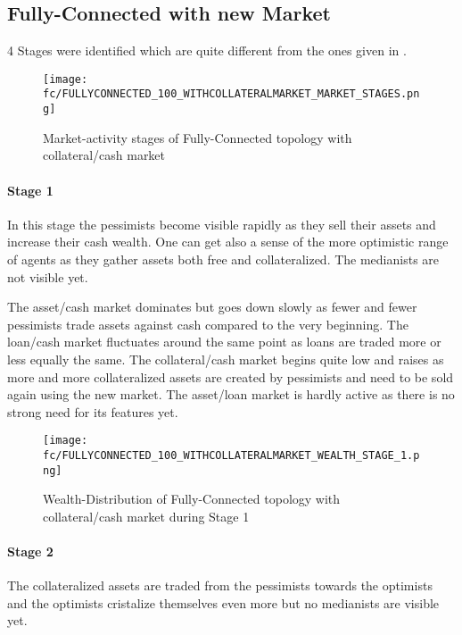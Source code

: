 \documentclass[Bachelorarbeit.tex]{subfiles}
\begin{document}
\subsection{Fully-Connected with new Market}

4 Stages were identified which are quite different from the ones given in \cite{Breuer_2015}.

\begin{figure}[H]
	\centering
  \texttt{[image: fc/FULLYCONNECTED\_100\_WITHCOLLATERALMARKET\_MARKET\_STAGES.png]}
  	\caption{Market-activity stages of Fully-Connected topology with collateral/cash market}
	\label{fig:markets_FULLYCONNECTED_100_WITHCOLLATERALMARKET_MARKET_STAGES}
\end{figure}

\paragraph{Stage 1}
In this stage the pessimists become visible rapidly as they sell their assets and increase their cash wealth. One can get also a sense of the more optimistic range of agents as they gather assets both free and collateralized. The medianists are not visible yet.

\medskip

The asset/cash market dominates but goes down slowly as fewer and fewer pessimists trade assets against cash compared to the very beginning. 
The loan/cash market fluctuates around the same point as loans are traded more or less equally the same.
The collateral/cash market begins quite low and raises as more and more collateralized assets are created by pessimists and need to be sold again using the new market.
The asset/loan market is hardly active as there is no strong need for its features yet.

\begin{figure}[H]
	\centering
  \texttt{[image: fc/FULLYCONNECTED\_100\_WITHCOLLATERALMARKET\_WEALTH\_STAGE\_1.png]}
  	\caption{Wealth-Distribution of Fully-Connected topology with collateral/cash market during Stage 1}
	\label{fig:markets_FULLYCONNECTED_100_WITHCOLLATERALMARKET_WEALTH_STAGE_1}
\end{figure}

\paragraph{Stage 2}
The collateralized assets are traded from the pessimists towards the optimists and the optimists cristalize themselves even more but no medianists are visible yet.
\end{document}
